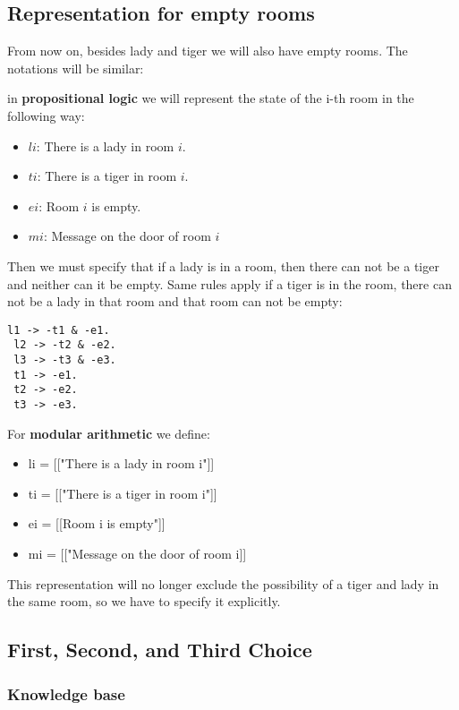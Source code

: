 \subsection{Representation for empty rooms}

From now on, besides lady and tiger we will also have empty rooms. The notations will be similar:

in \textbf{propositional logic} we will represent the state of the i-th room in the following way:

\begin{itemize}

\item $li$: There is a lady in room $i$.
\item $ti$: There is a tiger in room $i$.
\item $ei$: Room $i$ is empty.
\item $mi$: Message on the door of room $i$
 
\end{itemize}

Then we must specify that if a lady is in a room, then there can not be a tiger and neither can it be empty. Same rules apply if a tiger is in the room, there can not be a lady in that room and that room can not be empty:

\begin{lstlisting}[numbers=none]
 l1 -> -t1 & -e1.
 l2 -> -t2 & -e2.
 l3 -> -t3 & -e3.
 t1 -> -e1.
 t2 -> -e2.
 t3 -> -e3.
\end{lstlisting}


For \textbf{modular arithmetic} we define:

\begin{itemize}
    \item li = [["There is a lady in room i"]]
    \item ti = [["There is a tiger in room i"]]
    \item ei = [[Room i is empty"]]
    \item mi = [["Message on the door of room i]]
\end{itemize}

This representation will no longer exclude the possibility of a tiger and lady in the same room, so we have to specify it explicitly.

\subsection{First, Second, and Third Choice}

\subsubsection{Knowledge base}

